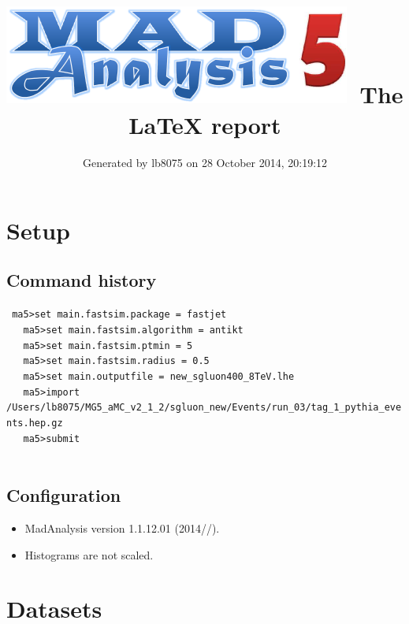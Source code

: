 \documentclass[a4paper, 11pt]{article}
\title{{\includegraphics[scale=.4]{logo.png}}\ The LaTeX report}
\author{Generated by lb8075 on 28 October 2014, 20:19:12}
\begin{document}
\maketitle
\flushbottom

\newpage
\section{ Setup}

\subsection{ Command history}

\texttt{ ma5>set main.fastsim.package = fastjet\\
}
\texttt{ }\texttt{ }\texttt{ ma5>set main.fastsim.algorithm = antikt\\
}
\texttt{ }\texttt{ }\texttt{ ma5>set main.fastsim.ptmin = 5\\
}
\texttt{ }\texttt{ }\texttt{ ma5>set main.fastsim.radius = 0.5\\
}
\texttt{ }\texttt{ }\texttt{ ma5>set main.outputfile = new\_sgluon400\_8TeV.lhe\\
}
\texttt{ }\texttt{ }\texttt{ ma5>import /\-Users/\-lb8075/\-MG5\_aMC\_v2\_1\_2/\-sgluon\_new/\-Events/\-run\_03/\-tag\_1\_pythia\_events.hep.gz\\
}
\texttt{ }\texttt{ }\texttt{ ma5>submit\\
}
\texttt{ }\texttt{ }\subsection{ Configuration}

\begin{itemize}
  \item MadAnalysis version 1.1.12.01 (2014//).
   \item Histograms are not scaled.
 
\end{itemize}
\newpage
\section{ Datasets}
\end{document}
